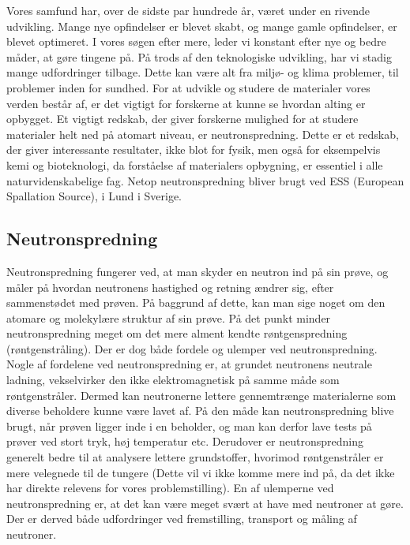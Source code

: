 \documentclass[12pt,oneside,a4paper]{article}
\begin{document}
{{{{{Vores samfund har, over de sidste par hundrede år, været under en rivende udvikling. Mange nye opfindelser er blevet skabt, og mange gamle opfindelser, er blevet optimeret. I vores søgen efter mere, leder vi konstant efter nye og bedre måder, at gøre tingene på. På trods af den teknologiske udvikling, har vi stadig mange udfordringer tilbage. Dette kan være alt fra miljø- og klima problemer, til problemer inden for sundhed. For at udvikle og studere de materialer vores verden består af, er det vigtigt for forskerne at kunne se hvordan alting er opbygget. Et vigtigt redskab, der giver forskerne mulighed for at studere materialer helt ned på atomart niveau, er neutronspredning. Dette er et redskab, der giver interessante resultater, ikke blot for fysik, men også for eksempelvis kemi og bioteknologi, da forståelse af materialers opbygning, er essentiel i alle naturvidenskabelige fag. Netop neutronspredning bliver brugt ved ESS (European Spallation Source), i Lund i Sverige. \cite{ess_folder}

\subsection{Neutronspredning}
Neutronspredning fungerer ved, at man skyder en neutron ind på sin prøve, og måler på hvordan neutronens hastighed og retning ændrer sig, efter sammenstødet med prøven. På baggrund af dette, kan man sige noget om den atomare og molekylære struktur af sin prøve. På det punkt minder neutronspredning meget om det mere alment kendte røntgenspredning (røntgenstråling). Der er dog både fordele og ulemper ved neutronspredning. Nogle af fordelene ved neutronspredning er, at grundet neutronens neutrale ladning, vekselvirker den ikke elektromagnetisk på samme måde som røntgenstråler. Dermed kan neutronerne lettere gennemtrænge materialerne som diverse beholdere kunne være lavet af. På den måde kan neutronspredning blive brugt, når prøven ligger inde i en beholder, og man kan derfor lave tests på prøver ved stort tryk, høj temperatur etc. Derudover er neutronspredning generelt bedre til at analysere lettere grundstoffer, hvorimod røntgenstråler er mere velegnede til de tungere (Dette vil vi ikke komme mere ind på, da det ikke har direkte relevens for vores problemstilling). En af ulemperne ved neutronspredning er, at det kan være meget svært at have med neutroner at gøre. Der er derved både udfordringer ved fremstilling, transport og måling af neutroner.

}}}}}
\end{document}
